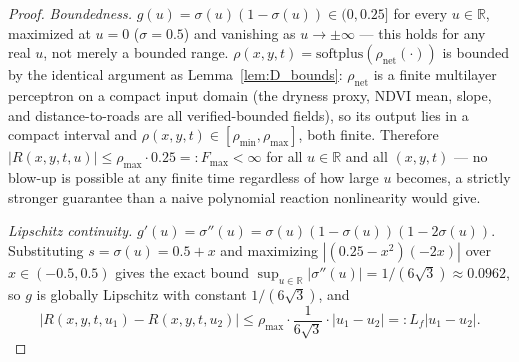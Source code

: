\documentclass[journal]{IEEEtran}
\begin{document}
\begin{proof}
\emph{Boundedness.} $g(u)=\sigma(u)(1-\sigma(u))\in(0,0.25]$ for every $u\in\mathbb{R}$, maximized at $u=0$ ($\sigma=0.5$) and vanishing as $u\to\pm\infty$ --- this holds for any real $u$, not merely a bounded range. $\rho(x,y,t)=\mathrm{softplus}(\rho_{\mathrm{net}}(\cdot))$ is bounded by the identical argument as Lemma~\ref{lem:D_bounds}: $\rho_{\mathrm{net}}$ is a finite multilayer perceptron on a compact input domain (the dryness proxy, NDVI mean, slope, and distance-to-roads are all verified-bounded fields), so its output lies in a compact interval and $\rho(x,y,t)\in[\rho_{\min},\rho_{\max}]$, both finite. Therefore $|R(x,y,t,u)|\leq\rho_{\max}\cdot0.25=:F_{\max}<\infty$ for all $u\in\mathbb{R}$ and all $(x,y,t)$ --- no blow-up is possible at any finite time regardless of how large $u$ becomes, a strictly stronger guarantee than a naive polynomial reaction nonlinearity would give.

\emph{Lipschitz continuity.} $g'(u)=\sigma''(u)=\sigma(u)(1-\sigma(u))(1-2\sigma(u))$. Substituting $s=\sigma(u)=0.5+x$ and maximizing $|(0.25-x^2)(-2x)|$ over $x\in(-0.5,0.5)$ gives the exact bound $\sup_{u\in\mathbb{R}}|\sigma''(u)|=1/(6\sqrt3)\approx0.0962$, so $g$ is globally Lipschitz with constant $1/(6\sqrt3)$, and
\begin{equation}
|R(x,y,t,u_1)-R(x,y,t,u_2)|\leq\rho_{\max}\cdot\frac{1}{6\sqrt3}\cdot|u_1-u_2|=:L_f|u_1-u_2|.
\end{equation}
\end{proof}
\end{document}
